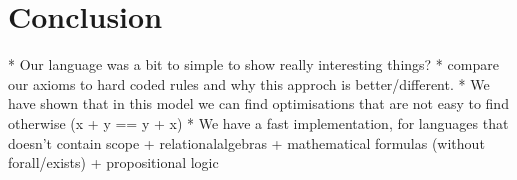 
\section{Conclusion}

* Our language was a bit to simple to show really interesting things?
* compare our axioms to hard coded rules and why this approch is better/different.
* We have shown that in this model we can find optimisations that are not easy
to find otherwise (x + y == y + x) 
* We have a fast implementation, for languages that doesn't contain scope 
 + relationalalgebras
 + mathematical formulas (without forall/exists)
 + propositional logic
 
